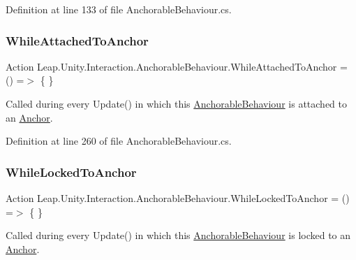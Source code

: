 Definition at line 133 of file Anchorable\+Behaviour.\+cs.

\mbox{\label{class_leap_1_1_unity_1_1_interaction_1_1_anchorable_behaviour_aaf482a8b7ddc06ccae2435b20e211c32}} 
\subsubsection{\texorpdfstring{WhileAttachedToAnchor}{WhileAttachedToAnchor}}
{\footnotesize\ttfamily Action Leap.\+Unity.\+Interaction.\+Anchorable\+Behaviour.\+While\+Attached\+To\+Anchor = () =$>$ \{ \}}



Called during every Update() in which this \mbox{\hyperlink{class_leap_1_1_unity_1_1_interaction_1_1_anchorable_behaviour}{Anchorable\+Behaviour}} is attached to an \mbox{\hyperlink{class_leap_1_1_unity_1_1_interaction_1_1_anchor}{Anchor}}. 



Definition at line 260 of file Anchorable\+Behaviour.\+cs.

\mbox{\label{class_leap_1_1_unity_1_1_interaction_1_1_anchorable_behaviour_ae28b784351149af7a30d9079820c1a35}} 
\subsubsection{\texorpdfstring{WhileLockedToAnchor}{WhileLockedToAnchor}}
{\footnotesize\ttfamily Action Leap.\+Unity.\+Interaction.\+Anchorable\+Behaviour.\+While\+Locked\+To\+Anchor = () =$>$ \{ \}}



Called during every Update() in which this \mbox{\hyperlink{class_leap_1_1_unity_1_1_interaction_1_1_anchorable_behaviour}{Anchorable\+Behaviour}} is locked to an \mbox{\hyperlink{class_leap_1_1_unity_1_1_interaction_1_1_anchor}{Anchor}}. 



